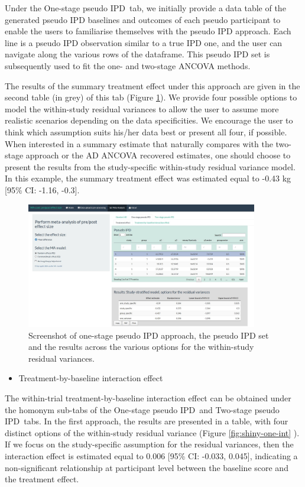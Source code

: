 \documentclass[AMA,STIX1COL]{WileyNJD-v2}
\begin{document}
Under the \textquotesingle One-stage pseudo IPD\textquotesingle\ tab, we initially provide a data table of the generated pseudo IPD baselines and outcomes of each pseudo participant to enable the users to familiarise themselves with the pseudo IPD approach. Each line is a pseudo IPD observation similar to a true IPD one, and the user can navigate along the various rows of the dataframe. This pseudo IPD set is subsequently used to fit the one- and two-stage ANCOVA methods. 

The results of the summary treatment effect under this approach are given in the second table (in grey) of this tab (Figure \ref{fig:shiny-one-stage}). We provide four possible options to model the within-study residual variances to allow the user to assume more realistic scenarios depending on the data specificities. We encourage the user to think which assumption suits his/her data best or present all four, if possible. When interested in a summary estimate that naturally compares with the two-stage approach or the AD ANCOVA recovered estimates, one should choose to present the results from the study-specific within-study residual variance model. In this example, the summary treatment effect was estimated equal to -0.43 kg [95\% CI: -1.16, -0.3].


\begin{figure}[t]
  \centering \includegraphics[width=0.9\textwidth]{one_stage.JPG}
    \caption{\small {Screenshot of one-stage pseudo IPD approach, the pseudo IPD set and the results across the various options for the within-study residual variances.}} \label{fig:shiny-one-stage}
\end{figure}

\begin{itemize}
\item Treatment-by-baseline interaction effect 
\end{itemize}
The within-trial treatment-by-baseline interaction effect can be obtained under the homonym sub-tabs of the \textquotesingle One-stage pseudo IPD\textquotesingle\ and \textquotesingle Two-stage pseudo IPD\textquotesingle\ tabs. In the first approach, the results are presented in a table, with four distinct options of the within-study residual variance (Figure \ref{fig:shiny-one-int} ). If we focus on the study-specific assumption for the residual variances, then the interaction effect is estimated equal to 0.006 [95\% CI: -0.033, 0.045], indicating a non-significant relationship at participant level between the baseline score and the treatment effect.
\end{document}
